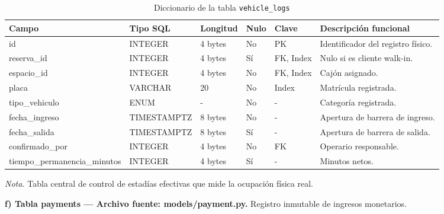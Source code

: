 \begin{table}[htbp]
\caption{Diccionario de la tabla \texttt{vehicle\_logs}}
\label{tab:dict_vehicle_logs}
\begin{tabular}{@{}p{6cm} p{3cm} p{1.5cm} p{1cm} p{1.5cm} p{3cm}@{}}
\toprule
\textbf{Campo} & \textbf{Tipo SQL} & \textbf{Longitud} & \textbf{Nulo} & \textbf{Clave} & \textbf{Descripción funcional} \\
\midrule
id & INTEGER & 4 bytes & No & PK & Identificador del registro físico. \\
reserva\_id & INTEGER & 4 bytes & Sí & FK, Index & Nulo si es cliente walk-in. \\
espacio\_id & INTEGER & 4 bytes & No & FK, Index & Cajón asignado. \\
placa & VARCHAR & 20 & No & Index & Matrícula registrada. \\
tipo\_vehiculo & ENUM & - & No & - & Categoría registrada. \\
fecha\_ingreso & TIMESTAMPTZ & 8 bytes & No & - & Apertura de barrera de ingreso. \\
fecha\_salida & TIMESTAMPTZ & 8 bytes & Sí & - & Apertura de barrera de salida. \\
confirmado\_por & INTEGER & 4 bytes & No & FK & Operario responsable. \\
tiempo\_permanencia\_minutos & INTEGER & 4 bytes & Sí & - & Minutos netos. \\
\bottomrule
\end{tabular}
\par\vspace{0.2cm}
\textit{Nota.} Tabla central de control de estadías efectivas que mide la ocupación física real.
\end{table}

\clearpage\textbf{f) Tabla payments — Archivo fuente: models/payment.py.} Registro inmutable de ingresos monetarios.

